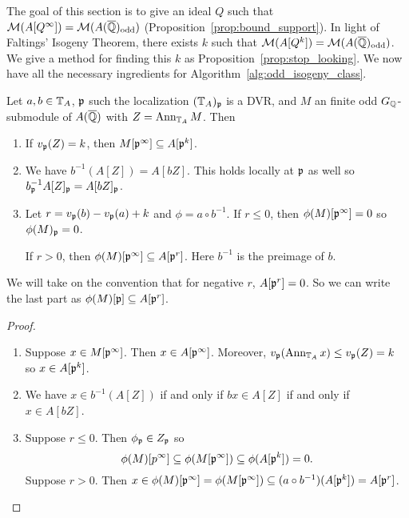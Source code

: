 \documentclass[thesis.tex]{subfiles}
\begin{document}
The goal of this section is to give an ideal $Q$ such that
$\mathcal{M}(A[Q^\infty])=\mathcal{M}(A(\overline{\mathbb{Q}})_{\mathrm{odd}})$ (Proposition~\ref{prop:bound_support}). In
light of Faltings' Isogeny Theorem, there exists $k$ such that
$\mathcal{M}(A[Q^k])=\mathcal{M}(A(\overline{\mathbb{Q}})_{\mathrm{odd}})$. We give a method for finding this $k$ as
Proposition~\ref{prop:stop_looking}. We now have all the necessary ingredients
for Algorithm~\ref{alg:odd_isogeny_class}.

\begin{lemma}\label{lem:com_alg}
    Let $a,b\in \mathbb{T}_A$, $\mathfrak{p}$ such the localization $(\mathbb{T}_A)_{\mathfrak{p}}$ is a DVR, and
    $M$ an finite odd $G_{\mathbb{Q}}$-submodule of $A(\overline{\mathbb{Q}})$ with $Z=\operatorname{Ann}_{\mathbb{T}_A} M$.
    Then
    \begin{enumerate}
        \item
            If $v_{\mathfrak{p}}(Z) = k$, then $M[\mathfrak{p}^\infty]\subseteq A[\mathfrak{p}^k]$.
        \item
            We have $b^{-1}(A[Z])=A[bZ]$. This holds locally at $\mathfrak{p}$ as well so
            $b_{\mathfrak{p}} ^{-1} A[Z]_{\mathfrak{p}} = A[bZ]_{\mathfrak{p}}$.
        \item
            Let $r=v_{\mathfrak{p}}(b)-v_{\mathfrak{p}}(a)+k$ and $\phi=a\circ b^{-1}$. If $r\leq
            0$, then $\phi(M)[\mathfrak{p}^\infty]=0$ so $\phi(M)_{\mathfrak{p}}=0$.

            If $r>0$, then
            $\phi(M)[\mathfrak{p}^\infty]\subseteq A[\mathfrak{p}^r]$. Here $b^{-1}$ is the
            preimage of $b$.
    \end{enumerate}
    We will take on the convention that for negative $r$, $A[\mathfrak{p}^r]=0$. So we can
    write the last part as $\phi(M)[\mathfrak{p}]\subseteq A[\mathfrak{p}^r]$.
\end{lemma}
\begin{proof}
    \mbox{}
    \begin{enumerate}
        \item
            Suppose $x\in M[\mathfrak{p}^\infty]$. Then $x\in A[\mathfrak{p}^\infty]$. Moreover,
            $v_{\mathfrak{p}}(\operatorname{Ann}_{\mathbb{T}_A} x) \leq v_{\mathfrak{p}}(Z) = k$ so $x\in A[\mathfrak{p}^k]$.
        \item
            We have $x\in b^{-1}(A[Z])$ if and only if $bx \in A[Z]$ if and
            only if $x\in A[bZ]$.
        \item
            Suppose $r\leq 0$. Then $\phi_{\mathfrak{p}} \in Z_{\mathfrak{p}}$ so
            \[
                \phi(M)[p^\infty]\subseteq \phi(M[\mathfrak{p}^\infty])
                \subseteq \phi(A[\mathfrak{p}^k]) = 0.
            \]
            Suppose $r>0$. Then $x\in \phi(M)[\mathfrak{p}^\infty] =
            \phi(M[\mathfrak{p}^\infty])\subseteq (a\circ
            b^{-1})(A[\mathfrak{p}^k])=A[\mathfrak{p}^r]$.
    \end{enumerate}
\end{proof}
\end{document}
